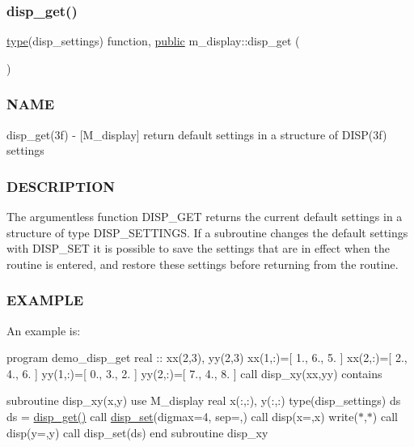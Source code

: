 \subsubsection{\texorpdfstring{disp\+\_\+get()}{disp\_get()}}
{\footnotesize\ttfamily \hyperlink{stop__watch_83_8txt_a70f0ead91c32e25323c03265aa302c1c}{type}(disp\+\_\+settings) function, \hyperlink{M__stopwatch_83_8txt_a2f74811300c361e53b430611a7d1769f}{public} m\+\_\+display\+::disp\+\_\+get (\begin{DoxyParamCaption}{ }\end{DoxyParamCaption})}



\subsubsection*{N\+A\+ME}

disp\+\_\+get(3f) -\/ \mbox{[}M\+\_\+display\mbox{]} return default settings in a structure of D\+I\+S\+P(3f) settings

\subsubsection*{D\+E\+S\+C\+R\+I\+P\+T\+I\+ON}

The argumentless function D\+I\+S\+P\+\_\+\+G\+ET returns the current default settings in a structure of type D\+I\+S\+P\+\_\+\+S\+E\+T\+T\+I\+N\+GS. If a subroutine changes the default settings with D\+I\+S\+P\+\_\+\+S\+ET it is possible to save the settings that are in effect when the routine is entered, and restore these settings before returning from the routine.

\subsubsection*{E\+X\+A\+M\+P\+LE}

An example is\+:

program demo\+\_\+disp\+\_\+get real \+:\+: xx(2,3), yy(2,3) xx(1,\+:)=\mbox{[} 1., 6., 5. \mbox{]} xx(2,\+:)=\mbox{[} 2., 4., 6. \mbox{]} yy(1,\+:)=\mbox{[} 0., 3., 2. \mbox{]} yy(2,\+:)=\mbox{[} 7., 4., 8. \mbox{]} call disp\+\_\+xy(xx,yy) contains

subroutine disp\+\_\+xy(x,y) use M\+\_\+display real x(\+:,\+:), y(\+:,\+:) type(disp\+\_\+settings) ds ds = \hyperlink{namespacem__display_a6a49f987c37a95e67744950ecee69530}{disp\+\_\+get()} call \hyperlink{interfacem__display_1_1disp__set}{disp\+\_\+set}(digmax=4, sep=\textquotesingle{},\textquotesingle{}) call disp(\textquotesingle{}x=\textquotesingle{},x) write($\ast$,$\ast$) call disp(\textquotesingle{}y=\textquotesingle{},y) call disp\+\_\+set(ds) end subroutine disp\+\_\+xy

